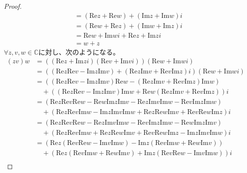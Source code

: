 \documentclass[dvipdfmx]{jsarticle}
\begin{document}
\begin{proof}
\begin{align*}
&= \left( \mathrm{Re}z + \mathrm{Re}w \right) + \left( \mathrm{Im}z + \mathrm{Im}w \right)i\\
&= \left( \mathrm{Re}w + \mathrm{Re}z \right) + \left( \mathrm{Im}w + \mathrm{Im}z \right)i\\
&= \mathrm{Re}w + \mathrm{Im}wi + \mathrm{Re}z + \mathrm{Im}zi\\
&= w + z
\end{align*}
$\forall z,v,w \in \mathbb{C}$に対し、次のようになる。
\begin{align*}
(zv)w &= \left( \left( \mathrm{Re}z + \mathrm{Im}zi \right)\left( \mathrm{Re}v + \mathrm{Im}vi \right) \right)\left( \mathrm{Re}w + \mathrm{Im}wi \right)\\
&= \left( \left( \mathrm{Re}z\mathrm{Re}v - \mathrm{Im}z\mathrm{Im}v \right) + \left( \mathrm{Re}z\mathrm{Im}v + \mathrm{Re}v\mathrm{Im}z \right)i \right)\left( \mathrm{Re}w + \mathrm{Im}wi \right)\\
&= \left( \left( \mathrm{Re}z\mathrm{Re}v - \mathrm{Im}z\mathrm{Im}v \right)\mathrm{Re}w - \left( \mathrm{Re}z\mathrm{Im}v + \mathrm{Re}v\mathrm{Im}z \right)\mathrm{Im}w \right) \\
&\quad + \left( \left( \mathrm{Re}z\mathrm{Re}v - \mathrm{Im}z\mathrm{Im}v \right)\mathrm{Im}w + \mathrm{Re}w\left( \mathrm{Re}z\mathrm{Im}v + \mathrm{Re}v\mathrm{Im}z \right) \right)i\\
&= \left( \mathrm{Re}z\mathrm{Re}v\mathrm{Re}w - \mathrm{Re}w\mathrm{Im}z\mathrm{Im}v - \mathrm{Re}z\mathrm{Im}v\mathrm{Im}w - \mathrm{Re}v\mathrm{Im}z\mathrm{Im}w \right) \\
&\quad + \left( \mathrm{Re}z\mathrm{Re}v\mathrm{Im}w - \mathrm{Im}z\mathrm{Im}v\mathrm{Im}w + \mathrm{Re}z\mathrm{Re}w\mathrm{Im}v + \mathrm{Re}v\mathrm{Re}w\mathrm{Im}z \right)i\\
&= \left( \mathrm{Re}z\mathrm{Re}v\mathrm{Re}w - \mathrm{Re}z\mathrm{Im}v\mathrm{Im}w - \mathrm{Re}v\mathrm{Im}z\mathrm{Im}w - \mathrm{Re}w\mathrm{Im}z\mathrm{Im}v \right) \\
&\quad + \left( \mathrm{Re}z\mathrm{Re}v\mathrm{Im}w + \mathrm{Re}z\mathrm{Re}w\mathrm{Im}v + \mathrm{Re}v\mathrm{Re}w\mathrm{Im}z - \mathrm{Im}z\mathrm{Im}v\mathrm{Im}w \right)i\\
&= \left( \mathrm{Re}z\left( \mathrm{Re}v\mathrm{Re}w - \mathrm{Im}v\mathrm{Im}w \right) - \mathrm{Im}z\left( \mathrm{Re}v\mathrm{Im}w + \mathrm{Re}w\mathrm{Im}v \right) \right) \\
&\quad + \left( \mathrm{Re}z\left( \mathrm{Re}v\mathrm{Im}w + \mathrm{Re}w\mathrm{Im}v \right) + \mathrm{Im}z\left( \mathrm{Re}v\mathrm{Re}w - \mathrm{Im}v\mathrm{Im}w \right) \right)i\\

\end{align*}
\end{proof}
\end{document}
